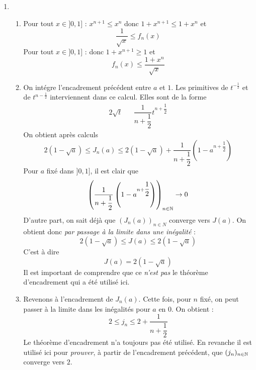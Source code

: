 \begin{enumerate}
\item
\begin{enumerate}
 \item Pour tout $x\in ]0,1]$ : $x^{n+1}\leq x^n$ donc $1+x^{n+1}\leq 1+x^n$ et
\begin{displaymath}
 \dfrac{1}{\sqrt{x}}\leq f_n(x)
\end{displaymath}
Pour tout $x\in ]0,1]$ : donc $1+x^{n+1}\geq 1$ et
\begin{displaymath}
 f_n(x) \leq \dfrac{1+x^{n}}{\sqrt{x}}
\end{displaymath}
\item On intégre l'encadrement précédent entre $a$ et $1$. Les primitives de $t^{-\frac{1}{2}}$ et de $t^{n-\frac{1}{2}}$ interviennent dans ce calcul. Elles sont de la forme
\begin{align*}
 2\sqrt{t} & & \dfrac{1}{n+\dfrac{1}{2}}t^{n+\dfrac{1}{2}}
\end{align*}
On obtient après calculs
\begin{displaymath}
 2(1-\sqrt{a})\leq J_n(a) \leq 2(1-\sqrt{a}) + \dfrac{1}{n+\dfrac{1}{2}}\left( 1 -a^{n+\dfrac{1}{2}}\right) 
\end{displaymath}
Pour $a$ fixé dans $]0,1]$, il est clair que 
\begin{displaymath}
 \left( \dfrac{1}{n+\dfrac{1}{2}}\left( 1 -a^{n+\dfrac{1}{2}}\right)\right)_{n\in \mathbb{N}} \rightarrow 0
\end{displaymath}
D'autre part, on sait déjà que $(J_n(a))_{n\in N}$ converge vers $J(a)$. On obtient donc \emph{par passage à la limite dans une inégalité} :
\begin{displaymath}
 2(1-\sqrt{a})\leq J(a) \leq 2(1-\sqrt{a})
\end{displaymath}
C'est à dire 
\begin{displaymath}
 J(a) = 2(1-\sqrt{a})
\end{displaymath}
Il est important de comprendre que ce \emph{n'est pas} le théorème d'encadrement qui a été utilisé ici.
\item Revenons à l'encadrement de $J_n(a)$. Cette fois, pour $n$ fixé, on peut passer à la limite dans les inégalités pour $a$ en $0$. On obtient :
\begin{displaymath}
 2 \leq j_n \leq 2 + \dfrac{1}{n+\dfrac{1}{2}}
\end{displaymath}
Le théorème d'encadrement n'a toujours pas été utilisé. En revanche il est utilisé ici pour \emph{prouver}, à partir de l'encadrement précédent, que $(j_n)_{n\in \mathbb{N}}$ converge vers $2$.
\end{enumerate}


\end{enumerate}
